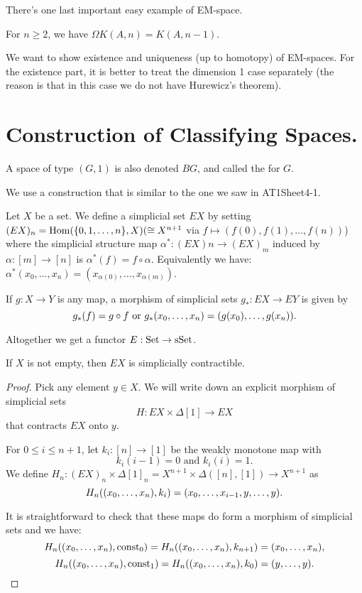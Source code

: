 

There's one last important easy example of EM-space.

\begin{example}
For $n\geq2$, we have $\Omega K(A,n)=K(A,n-1)$.
\end{example}

We want to show existence and uniqueness (up to homotopy) of EM-spaces. For the existence part, it is better to treat the dimension 1 case separately (the reason is that in this case we do not have Hurewicz's theorem).

\section{Construction of Classifying Spaces.}
\label{section:construction-of-classifying-spaces}

A space of type $(G,1)$ is also denoted $BG$, and called the  for $G$.

We use a construction that is similar to the one we saw in AT1Sheet4-1.

\begin{construction}
Let $X$ be a set. We define a simplicial set $EX$ by setting $(EX)_n=\operatorname{Hom}(\{0,1,\dots,n\},X)(\cong X^{n+1}$ via $f\mapsto(f(0),f(1),\dots,f(n))$) where the simplicial structure map $\alpha^*:(EX)n\to(EX)_m$ induced by $\alpha:[m]\to[n]$ is $\alpha^*(f)=f\circ\alpha$. Equivalently we have: $\alpha^*(x_0,\dots,x_n)=(x_{\alpha(0)},\dots,x_{\alpha(m)})$.

If $g:X\to Y$ is any map, a morphism of simplicial sets $g_*:EX\to EY$ is given by
\[g_*(f)=g\circ f\text{ or }g_*({x_0,\dots,x_n})=(g(x_0),\dots,g(x_n)).\]

Altogether we get a functor $E:{\mathrm{Set}}\to{\mathrm{sSet}}$.
\end{construction}

\begin{proposition}
If $X$ is not empty, then $EX$ is simplicially contractible.
\end{proposition}

\begin{proof}
Pick any element $y\in X$. We will write down an explicit morphism of simplicial sets
\[H:EX\times\Delta[1]\to EX\]
that contracts $EX$ onto $y$.

For $0 \le i \le n+1$, let $k_i:[n]\to[1]$ be the weakly monotone map with
\[k_i(i-1)=0\text{ and }k_i(i)=1.\]
We define $H_n:(EX)_n\times\Delta[1]_n=X^{n+1}\times\Delta([n],[1])\to X^{n+1}$ as
\[H_n(({x_0,\dots,x_n}),k_i)=(x_0,\dots,x_{i-1},y,\dots,y).\]

It is straightforward to check that these maps do form a morphism of simplicial sets and we have:
\[H_n(({x_0,\dots,x_n}),\operatorname{const}_0)=H_n(({x_0,\dots,x_n}),k_{n+1})=({x_0,\dots,x_n}),\]
\[H_n(({x_0,\dots,x_n}),\operatorname{const}_1)=H_n(({x_0,\dots,x_n}),k_0)=(y,\dots,y).\]
\end{proof}

